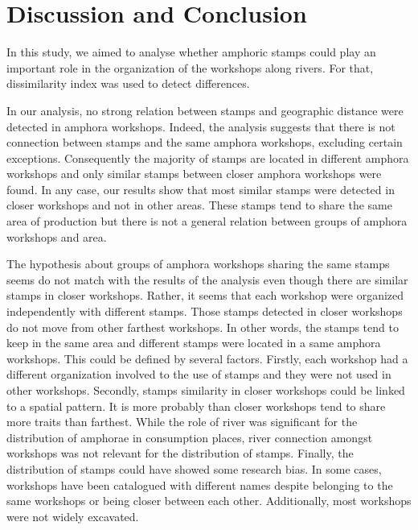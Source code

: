 \documentclass[review]{elsarticle}
\begin{document}



\section{Discussion and Conclusion}



In this study, we aimed to analyse whether amphoric stamps could play an important role in the organization of the workshops along rivers. For that, dissimilarity index was used to detect differences. 

In our analysis, no strong relation between stamps and geographic distance were detected in amphora workshops. Indeed, the analysis suggests that there is not connection between stamps and the same amphora workshops, excluding certain exceptions. Consequently the majority of stamps are located in different amphora workshops and only similar stamps between closer amphora workshops were found. In any case, our results show that most similar stamps were detected in closer workshops and not in other areas. These stamps tend to share the same area of production but there is not a general relation between groups of amphora workshops and area. 

The hypothesis about groups of amphora workshops sharing the same stamps seems do not match with the results of the analysis even though there are similar stamps in closer workshops. Rather, it seems that each workshop were organized independently with different stamps. Those stamps detected in closer workshops do not move from other farthest workshops. In other words, the stamps tend to keep in the same area and different stamps were located in a same amphora workshops. 
This could be defined by several factors. Firstly, each workshop had a different organization involved to the use of stamps and they were not used in other workshops. Secondly, stamps similarity in closer workshops could be linked to a spatial pattern. It is more probably than closer workshops tend to share more traits than farthest. While the role of river was significant for the distribution of amphorae in consumption places, river connection amongst workshops was not relevant for the distribution of stamps. Finally, the distribution of stamps could have showed some research bias. In some cases, workshops have been catalogued with different names despite belonging to the same workshops or being closer between each other. Additionally, most workshops were not widely excavated. 
\end{document}
